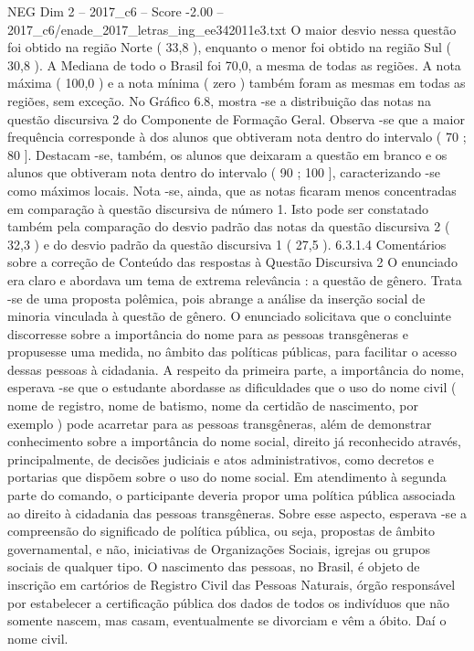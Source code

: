 \begin{textsample}{NEG Dim 2 – 2017\_c6 – Score -2.00 – 2017\_c6/enade\_2017\_letras\_ing\_ee342011e3.txt}
O maior desvio nessa questão foi obtido na região Norte ( 33,8 ), enquanto o menor foi obtido na região Sul ( 30,8 ).
A Mediana de todo o Brasil foi 70,0, a mesma de todas as regiões.
A nota máxima ( 100,0 ) e a nota mínima ( zero ) também foram as mesmas em todas as regiões, sem exceção.
No Gráfico 6.8, mostra -se a distribuição das notas na questão discursiva 2 do Componente de Formação Geral.
Observa -se que a maior frequência corresponde à dos alunos que obtiveram nota dentro do intervalo ( 70 ; 80 ].
Destacam -se, também, os alunos que deixaram a questão em branco e os alunos que obtiveram nota dentro do intervalo ( 90 ; 100 ], caracterizando -se como máximos locais.
Nota -se, ainda, que as notas ficaram menos concentradas em comparação à questão discursiva de número 1.
Isto pode ser constatado também pela comparação do desvio padrão das notas da questão discursiva 2 ( 32,3 ) e do desvio padrão da questão discursiva 1 ( 27,5 ). 6.3.1.4 Comentários sobre a correção de Conteúdo das respostas à Questão Discursiva 2 O enunciado era claro e abordava um tema de extrema relevância : a questão de gênero.
Trata -se de uma proposta polêmica, pois abrange a análise da inserção social de minoria vinculada à questão de gênero.
O enunciado solicitava que o concluinte discorresse sobre a importância do nome para as pessoas transgêneras e propusesse uma medida, no âmbito das políticas públicas, para facilitar o acesso dessas pessoas à cidadania.
A respeito da primeira parte, a importância do nome, esperava -se que o estudante abordasse as dificuldades que o uso do nome civil ( nome de registro, nome de batismo, nome da certidão de nascimento, por exemplo ) pode acarretar para as pessoas transgêneras, além de demonstrar conhecimento sobre a importância do nome social, direito já reconhecido através, principalmente, de decisões judiciais e atos administrativos, como decretos e portarias que dispõem sobre o uso do nome social.
Em atendimento à segunda parte do comando, o participante deveria propor uma política pública associada ao direito à cidadania das pessoas transgêneras.
Sobre esse aspecto, esperava -se a compreensão do significado de política pública, ou seja, propostas de âmbito governamental, e não, iniciativas de Organizações Sociais, igrejas ou grupos sociais de qualquer tipo.
O nascimento das pessoas, no Brasil, é objeto de inscrição em cartórios de Registro Civil das Pessoas Naturais, órgão responsável por estabelecer a certificação pública dos dados de todos os indivíduos que não somente nascem, mas casam, eventualmente se divorciam e vêm a óbito.
Daí o nome civil.

\end{textsample}
